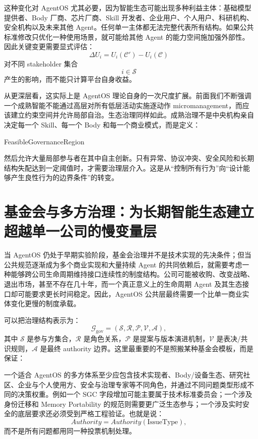 这种变化对 AgentOS 尤其必要，因为智能生态可能出现多种利益主体：基础模型提供者、Body 厂商、芯片厂商、Skill 开发者、企业用户、个人用户、科研机构、安全机构以及未来其他 Agent。任何单一主体都无法完整代表所有结构。如果公共标准修改只优化一种使用场景，就可能给其他 Agent 的能力空间施加强外部性。因此关键变更需要显式评估：
\[
\Delta U_i
=
U_i(\mathcal C')
-
U_i(\mathcal C)
\]
对不同 stakeholder 集合
\[
i\in\mathcal S
\]
产生的影响，而不能只计算平台自身收益。

从更深层看，这实际上是 AgentOS 理论自身的一次尺度扩展。前面我们不断强调一个成熟智能不能通过高层对所有低层活动实施逐动作 micromanagement，而应该建立约束空间并允许局部自治。生态治理同样如此。成熟治理不是中央机构亲自决定每一个 Skill、每一个 Body 和每一个商业模式，而是定义：
\begin{statementbox}
FeasibleGovernanceRegion
\end{statementbox}
然后允许大量局部参与者在其中自主创新。只有异常、协议冲突、安全风险和长期结构失配达到一定阈值时，才需要治理层介入。这是从``控制所有行为''向``设计能够产生良性行为的边界条件''的转变。

\section{基金会与多方治理：为长期智能生态建立超越单一公司的慢变量层}

当 AgentOS 仍处于早期实验阶段，基金会治理并不是技术实现的先决条件；但当公共规范逐渐成为多个商业实现和大量持续 Agent 的共同依赖后，就需要考虑一种能够跨公司生命周期维持接口连续性的制度结构。公司可能被收购、改变战略、退出市场，甚至不存在几十年，而一个真正意义上的生命周期 Agent 及其生态接口却可能要求更长时间稳定。因此，AgentOS 公共层最终需要一个比单一商业实体变化更慢的制度承载。

可以把治理结构表示为：
\[
\mathcal G_{\mathrm{gov}}
=
(
\mathcal S,
\mathcal R,
\mathcal P,
\mathcal V,
\mathcal A
),
\]
其中 $\mathcal S$ 是参与方集合，$\mathcal R$ 是角色关系，$\mathcal P$ 是提案与版本演进机制，$\mathcal V$ 是表决/共识规则，$\mathcal A$ 是最终 authority 边界。这里最重要的不是照搬某种基金会模板，而是保证：
\begin{statementbox}
\centering
{}
\end{statementbox}

一个适合 AgentOS 的多方体系至少应包含技术实现者、Body/设备生态、研究社区、企业与个人使用方、安全与治理专家等不同角色，并通过不同问题类型形成不同的决策权重。例如一个 SGC 字段增加可能主要属于技术标准委员会；一个涉及身份迁移和 Memory Portability 的规范则需要更广泛生态参与；一个涉及实时安全的底层要求还必须受到严格工程验证。也就是说：
\[
Authority
=
Authority(\text{IssueType}),
\]
而不是所有问题都用同一种投票机制处理。

